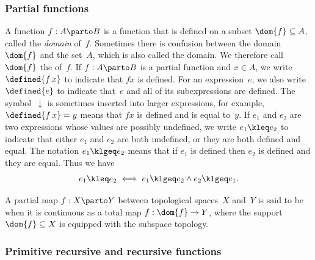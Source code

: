 \subsubsection*{Partial functions}

A  function $f: A \parto B$ is a function that is defined on a subset
$\dom{f} \subseteq A$, called the \emph{domain} of~$f$. Sometimes
there is confusion between the domain~$\dom{f}$ and the set~$A$, which
is also called the domain. We therefore call $\dom{f}$ the
 of~$f$. If $f: A \parto B$ is a partial function and $x
\in A$, we write $\defined{f\, x}$ to indicate that $f x$ is defined.
For an expression~$e$, we also write $\defined{e}$ to indicate
that~$e$ and all of its subexpressions are defined. The
symbol~$\downarrow$ is sometimes inserted into larger expressions, for
example, $\defined{f\, x} = y$ means that $f x$ is defined and is
equal to~$y$. If $e_1$ and $e_2$ are two expressions whose values are
possibly undefined, we write $e_1 \kleq e_2$ to indicate that either
$e_1$ and $e_2$ are both undefined, or they are both defined and
equal. The notation $e_1 \klgeq e_2$ means that if $e_1$ is defined
then $e_2$ is defined and they are equal. Thus we have
%
\begin{equation*}
  e_1 \kleq e_2 \iff e_1 \klgeq e_2 \land e_2 \klgeq e_1.
\end{equation*}

A partial map $f: X \parto Y$ between topological spaces~$X$ and~$Y$
is said to be  when it is continuous as a total map
$f: \dom{f} \to Y$, where the support $\dom{f} \subseteq
X$ is equipped with the subspace topology.



\subsubsection*{Primitive recursive and recursive functions}

